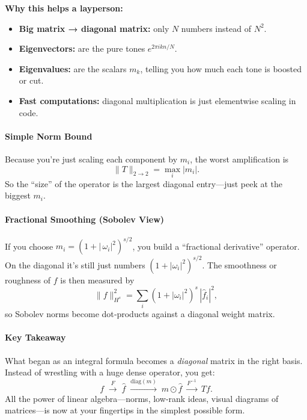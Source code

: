 \noindent\textbf{Why this helps a layperson:}
\begin{itemize}
  \item \textbf{Big matrix → diagonal matrix:} only \(N\) numbers instead of \(N^2\).  
  \item \textbf{Eigenvectors:} are the pure tones \(e^{2\pi i k n/N}\).  
  \item \textbf{Eigenvalues:} are the scalars \(m_k\), telling you how much each tone is boosted or cut.  
  \item \textbf{Fast computations:} diagonal multiplication is just elementwise scaling in code.  
\end{itemize}

\paragraph{Simple Norm Bound}  
Because you’re just scaling each component by \(m_i\), the worst amplification is
\[
\|T\|_{2\to2}
= \max_i |m_i|.
\]
So the “size” of the operator is the largest diagonal entry—just peek at the biggest \(m_i\).

\paragraph{Fractional Smoothing (Sobolev View)}  
If you choose \(m_i = (1 + |\,\omega_i|^2)^{s/2}\), you build a “fractional derivative” operator.  On the diagonal it’s still just numbers \((1+|\omega_i|^2)^{s/2}\).  The smoothness or roughness of \(f\) is then measured by
\[
\|f\|_{H^s}^2 = \sum_i (1+|\omega_i|^2)^s\,|\hat f_i|^2,
\]
so Sobolev norms become dot‐products against a diagonal weight matrix.

\paragraph{Key Takeaway}  
What began as an integral formula becomes a \emph{diagonal} matrix in the right basis.  Instead of wrestling with a huge dense operator, you get:
\[
f \;\xrightarrow{F}\;\hat f
\;\xrightarrow{\mathrm{diag}(m)}\;m\odot\hat f
\;\xrightarrow{F^{-1}}\;Tf.
\]
All the power of linear algebra—norms, low‐rank ideas, visual diagrams of matrices—is now at your fingertips in the simplest possible form.














